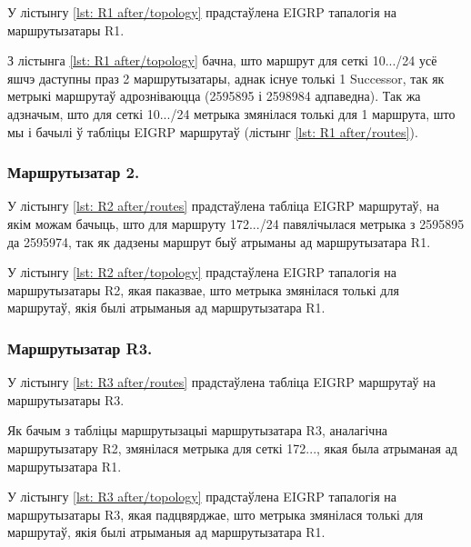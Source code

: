 У лістынгу \ref{lst: R1 after/topology} прадстаўлена EIGRP тапалогія
на маршрутызатары R1.



З лістынга \ref{lst: R1 after/topology} бачна, што маршрут для сеткі
10.../24 усё яшчэ даступны праз 2 маршрутызатары,
аднак існуе толькі 1 Successor, так як метрыкі маршрутаў адрозніваюцца
(2595895 і 2598984 адпаведна). Так жа адзначым, што для сеткі
10.../24 метрыка змянілася толькі для 1 маршрута, што
мы і бачылі ў табліцы EIGRP маршрутаў (лістынг \ref{lst: R1 after/routes}).

\subsubsection{Маршрутызатар 2.}

У лістынгу \ref{lst: R2 after/routes} прадстаўлена табліца
EIGRP маршрутаў, на якім можам бачыць, што для маршруту
172.../24 павялічылася метрыка з 2595895 да 2595974, так як
дадзены маршрут быў атрыманы ад маршрутызатара R1.




У лістынгу \ref{lst: R2 after/topology} прадстаўлена EIGRP тапалогія
на маршрутызатары R2, якая паказвае, што метрыка змянілася толькі
для маршрутаў, якія былі атрыманыя ад маршрутызатара R1.



\subsubsection{Маршрутызатар R3.}

У лістынгу \ref{lst: R3 after/routes} прадстаўлена табліца EIGRP маршрутаў на маршрутызатары R3.



Як бачым з табліцы маршрутызацыі маршрутызатара R3, аналагічна маршрутызатару R2, змянілася метрыка
для сеткі 172..., якая была атрыманая ад маршрутызатара R1.

У лістынгу \ref{lst: R3 after/topology} прадстаўлена EIGRP тапалогія
на маршрутызатары R3, якая падцвярджае, што метрыка змянілася толькі
для маршрутаў, якія былі атрыманыя ад маршрутызатара R1.


